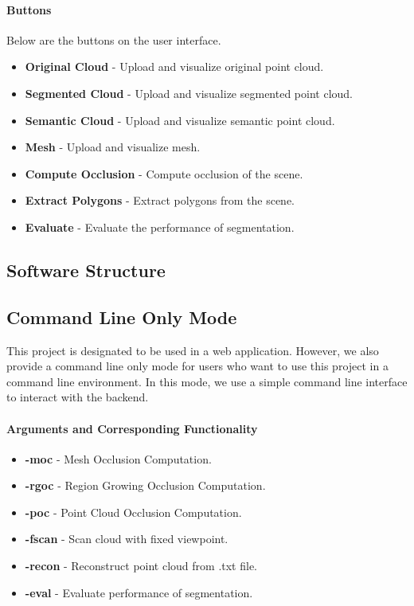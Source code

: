 \documentclass[11pt, a4paper,oneside,chapterprefix=false]{scrbook}
\begin{document}
\paragraph{Buttons}

Below are the buttons on the user interface.

\begin{itemize}
	\item \textbf{Original Cloud} - Upload and visualize original point cloud.
	\item \textbf{Segmented Cloud} - Upload and visualize segmented point cloud.
	\item \textbf{Semantic Cloud} - Upload and visualize semantic point cloud.
	\item \textbf{Mesh} - Upload and visualize mesh.
	\item \textbf{Compute Occlusion} - Compute occlusion of the scene.
	\item \textbf{Extract Polygons} - Extract polygons from the scene.
	\item \textbf{Evaluate} - Evaluate the performance of segmentation.
\end{itemize}

\subsection{Software Structure}


\subsection{Command Line Only Mode}

This project is designated to be used in a web application. However, we also provide a command line only mode for users who want to use this project in a command line environment. In this mode, we use a simple command line interface to interact with the backend.

\paragraph{Arguments and Corresponding Functionality}

\begin{itemize}
	\item \textbf{-moc} - Mesh Occlusion Computation.
	\item \textbf{-rgoc} - Region Growing Occlusion Computation.
	\item \textbf{-poc} - Point Cloud Occlusion Computation.
	\item \textbf{-fscan} - Scan cloud with fixed viewpoint.
	\item \textbf{-recon} - Reconstruct point cloud from .txt file.
	\item \textbf{-eval} - Evaluate performance of segmentation.
\end{itemize}
\end{document}
